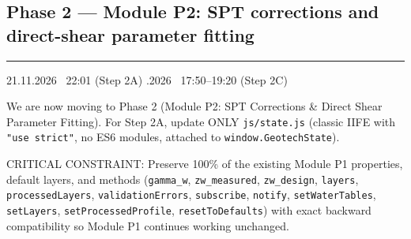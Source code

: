 \documentclass[11pt,a4paper]{article}
\newcommand{\stamp}[1]{{\small\bfseries\color{black!70}\textcolor{accent}{\rule[-2pt]{2pt}{10pt}}\hspace{6pt}#1}\par}
\newcommand{\code}[1]{\texttt{\small #1}}
\begin{document}
\subsection{Phase 2 --- Module P2: SPT corrections and direct-shear parameter fitting}
\stamp{21.11.2026 \textbar\ 22:01 (Step 2A) .2026 \textbar\ 17:50--19:20 (Step 2C)}
\begin{prompt}
We are now moving to Phase 2 (Module P2: SPT Corrections \& Direct Shear Parameter Fitting). For Step 2A, update ONLY
\code{js/state.js} (classic IIFE with \code{"use strict"}, no ES6 modules, attached to \code{window.GeotechState}).

CRITICAL CONSTRAINT: Preserve 100\% of the existing Module P1 properties, default layers, and methods
(\code{gamma\_w}, \code{zw\_measured}, \code{zw\_design}, \code{layers}, \code{processedLayers},
\code{validationErrors}, \code{subscribe}, \code{notify}, \code{setWaterTables}, \code{setLayers},
\code{setProcessedProfile}, \code{resetToDefaults}) with exact backward compatibility so Module P1 continues working
unchanged.


\end{prompt}
\end{document}
